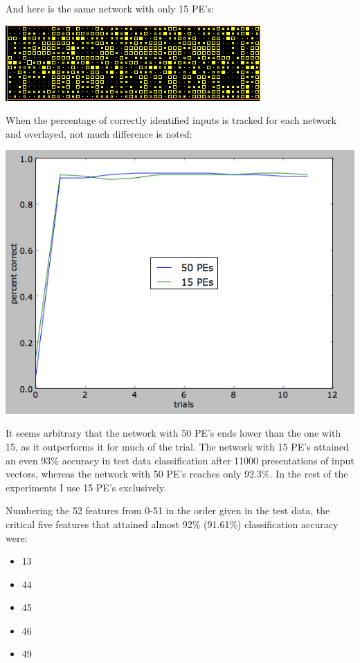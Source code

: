\documentclass[12pt]{article}
\begin{document}
And here is the same network with only 15 PE's:

\begin{center}
\includegraphics[scale=0.9]{52f15kweights.png}
\end{center}

When the percentage of correctly identified inputs is tracked for each network and overlayed, not much difference is noted:

\begin{center}
\includegraphics[scale=0.6]{52features.png}
\end{center}

It seems arbitrary that the network with 50 PE's ends lower than the one with 15, as it outperforms it for much of the trial.  The network with 15 PE's attained an even 93\% accuracy in test data classification after 11000 presentations of input vectors, whereas the network with 50 PE's reaches only 92.3\%.  In the rest of the experiments I use 15 PE's exclusively.

Numbering the 52 features from 0-51 in the order given in the test data, the critical five features that attained almost 92\% (91.61\%) classification accuracy were:

\begin{itemize}
\item 13
\item 44
\item 45
\item 46
\item 49
\end{itemize}
\end{document}
